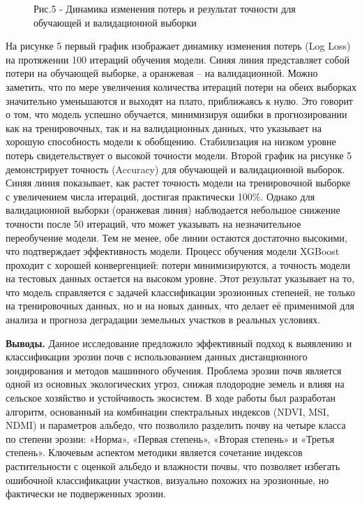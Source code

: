 \begin{figure}[H]
\begin{subfigure}{0.45\textwidth}
   \end{subfigure}
   \caption*{Рис.5 - Динамика изменения потерь и результат точности для обучающей и валидационной выборки}
\end{figure}

\begin{multicols}{2}
На рисунке 5 первый график изображает динамику изменения потерь (Log
Loss) на протяжении 100 итераций обучения модели. Синяя линия
представляет собой потери на обучающей выборке, а оранжевая -- на
валидационной. Можно заметить, что по мере увеличения количества
итераций потери на обеих выборках значительно уменьшаются и выходят на
плато, приближаясь к нулю. Это говорит о том, что модель успешно
обучается, минимизируя ошибки в прогнозировании как на тренировочных,
так и на валидационных данных, что указывает на хорошую способность
модели к обобщению. Стабилизация на низком уровне потерь свидетельствует
о высокой точности модели. Второй график на рисунке 5 демонстрирует
точность (Accuracy) для обучающей и валидационной выборок. Синяя линия
показывает, как растет точность модели на тренировочной выборке с
увеличением числа итераций, достигая практически 100\%. Однако для
валидационной выборки (оранжевая линия) наблюдается небольшое снижение
точности после 50 итераций, что может указывать на незначительное
переобучение модели. Тем не менее, обе линии остаются достаточно
высокими, что подтверждает эффективность модели. Процесс обучения модели
XGBoost проходит с хорошей конвергенцией: потери минимизируются, а
точность модели на тестовых данных остается на высоком уровне. Этот
результат указывает на то, что модель справляется с задачей
классификации эрозионных степеней, не только на тренировочных данных, но
и на новых данных, что делает её применимой для анализа и прогноза
деградации земельных участков в реальных условиях.

{\bfseries Выводы.} Данное исследование предложило эффективный подход к
выявлению и классификации эрозии почв с использованием данных
дистанционного зондирования и методов машинного обучения. Проблема
эрозии почв является одной из основных экологических угроз, снижая
плодородие земель и влияя на сельское хозяйство и устойчивость
экосистем. В ходе работы был разработан алгоритм, основанный на
комбинации спектральных индексов (NDVI, MSI, NDMI) и параметров альбедо,
что позволило разделить почву на четыре класса по степени эрозии:
«Норма», «Первая степень», «Вторая степень» и «Третья степень». Ключевым
аспектом методики является сочетание индексов растительности с оценкой
альбедо и влажности почвы, что позволяет избегать ошибочной
классификации участков, визуально похожих на эрозионные, но фактически
не подверженных эрозии.


\end{multicols}
